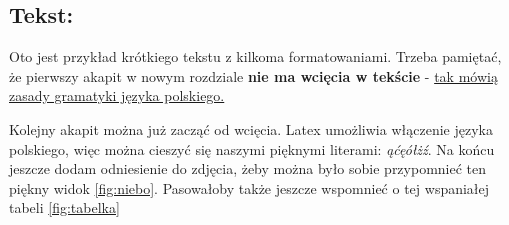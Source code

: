 \subsection{Tekst: }
    \justifying
    \noindent Oto jest przykład krótkiego tekstu z kilkoma formatowaniami.
    Trzeba pamiętać, że pierwszy akapit w nowym rozdziale \textbf{nie ma wcięcia w tekście} - \underline{tak mówią zasady gramatyki języka polskiego.}
    \par
    Kolejny akapit można już zacząć od wcięcia. Latex umożliwia włączenie języka polskiego, więc można cieszyć się naszymi pięknymi literami: \textit{ąćęółżź}.
    Na końcu jeszcze dodam odniesienie do zdjęcia, żeby można było sobie przypomnieć ten piękny widok
    \ref{fig:niebo}.
    Pasowałoby także jeszcze wspomnieć o tej wspaniałej tabeli \ref{fig:tabelka}
\newpage